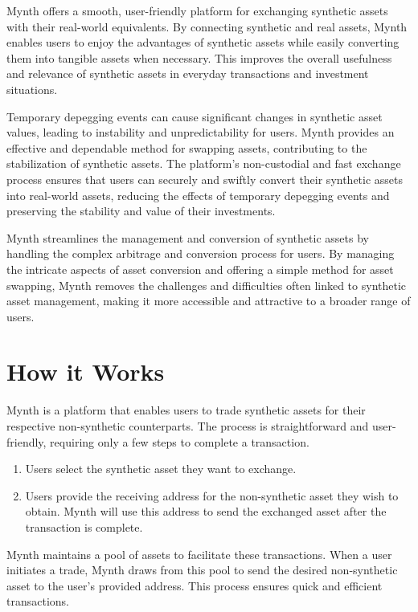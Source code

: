 Mynth offers a smooth, user-friendly platform for exchanging synthetic
assets with their real-world equivalents. By connecting synthetic and
real assets, Mynth enables users to enjoy the advantages of synthetic
assets while easily converting them into tangible assets when necessary.
This improves the overall usefulness and relevance of synthetic assets
in everyday transactions and investment situations.

Temporary depegging events can cause significant changes in synthetic
asset values, leading to instability and unpredictability for users.
Mynth provides an effective and dependable method for swapping assets,
contributing to the stabilization of synthetic assets. The platform's
non-custodial and fast exchange process ensures that users can securely
and swiftly convert their synthetic assets into real-world assets,
reducing the effects of temporary depegging events and preserving the
stability and value of their investments.

Mynth streamlines the management and conversion of synthetic assets by
handling the complex arbitrage and conversion process for users. By
managing the intricate aspects of asset conversion and offering a simple
method for asset swapping, Mynth removes the challenges and difficulties
often linked to synthetic asset management, making it more accessible
and attractive to a broader range of users.

\hypertarget{how-it-works}{%
\section{How it Works}\label{how-it-works}}

Mynth is a platform that enables users to trade synthetic assets for
their respective non-synthetic counterparts. The process is
straightforward and user-friendly, requiring only a few steps to
complete a transaction.

\begin{enumerate}
\item
  Users select the synthetic asset they want to exchange.
\item
  Users provide the receiving address for the non-synthetic asset they
  wish to obtain. Mynth will use this address to send the exchanged
  asset after the transaction is complete.
\end{enumerate}

Mynth maintains a pool of assets to facilitate these transactions. When
a user initiates a trade, Mynth draws from this pool to send the desired
non-synthetic asset to the user's provided address. This process ensures
quick and efficient transactions.

